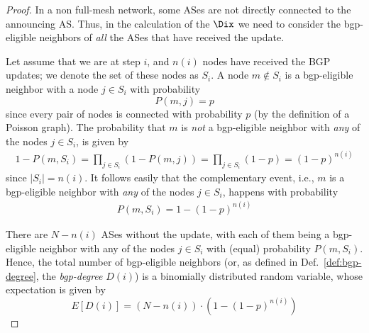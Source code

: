 \begin{proof}
In a non full-mesh network, some ASes are not directly connected to the announcing AS. Thus, in the calculation of the $\Dix$ we need to consider the bgp-eligible neighbors of \textit{all} the ASes that have received the update.

Let assume that we are at step $i$, and $n(i)$ nodes have received the BGP updates; we denote the set of these nodes as $S_{i}$. A node $m\notin S_{i}$ is a bgp-eligible neighbor with a node $j\in S_{i}$ with probability
\begin{equation}
P(m,j) = p
\end{equation}
since every pair of nodes is connected with probability $p$ (by the definition of a Poisson graph). The probability that $m$ is \textit{not} a bgp-eligible neighbor with \textit{any} of the nodes $j\in S_{i}$, is given by
\begin{align}
1-P(m,S_{i}) = \prod_{j\in S_{i}}(1-P(m,j)) = \prod_{j\in S_{i}}(1-p) = (1-p)^{n(i)}
\end{align}
since $|S_{i}| = n(i)$. It follows easily that the complementary event, i.e., $m$ is a bgp-eligible neighbor with \textit{any} of the nodes $j\in S_{i}$, happens with probability
\begin{align}
P(m,S_{i}) = 1- (1-p)^{n(i)}
\end{align}

There are $N-n(i)$ ASes without the update, with each of them being a bgp-eligible neighbor with any of the nodes $j\in S_{i}$ with (equal) probability $P(m,S_{i})$. Hence, the total number of bgp-eligible neighbors (or, as defined in Def.~\ref{def:bgp-degree}, the \textit{bgp-degree} $D(i)$) is a binomially distributed random variable, whose expectation is given by 
\begin{equation}
E[D(i)] = (N-n(i))\cdot (1-(1-p)^{n(i)})
\end{equation}
\end{proof}



